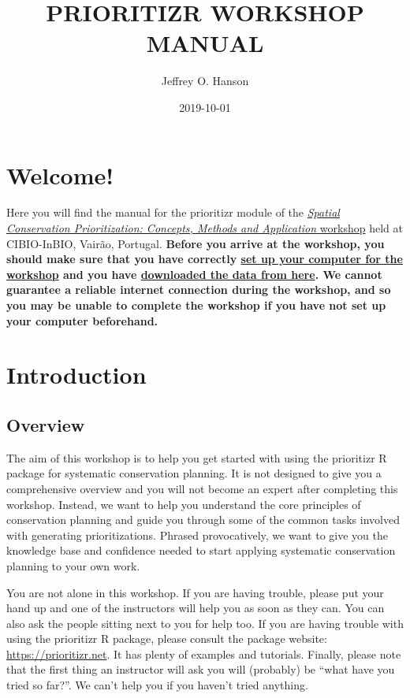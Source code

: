 \documentclass[12pt,]{book}
\title{PRIORITIZR WORKSHOP MANUAL}
\author{Jeffrey O. Hanson}
\date{2019-10-01}
\begin{document}
\maketitle

{
\hypersetup{linkcolor=black}
\setcounter{tocdepth}{0}
\tableofcontents
}
\chapter{Welcome!}\label{welcome}

Here you will find the manual for the prioritizr module of the
\href{https://cibio.up.pt/workshops--courses/details/advanced-course-spatial-conservation-prioritization-}{\emph{Spatial
Conservation Prioritization: Concepts, Methods and Application}
workshop} held at CIBIO-InBIO, Vairão, Portugal. \textbf{Before you
arrive at the workshop, you should make sure that you have correctly
\protect\hyperlink{setup}{set up your computer for the workshop} and you
have
\href{https://github.com/prioritizr/cibio-workshop/raw/master/data.zip}{downloaded
the data from here}. We cannot guarantee a reliable internet connection
during the workshop, and so you may be unable to complete the workshop
if you have not set up your computer beforehand.}

\chapter{Introduction}\label{introduction}

\section{Overview}\label{overview}

The aim of this workshop is to help you get started with using the
prioritizr R package for systematic conservation planning. It is not
designed to give you a comprehensive overview and you will not become an
expert after completing this workshop. Instead, we want to help you
understand the core principles of conservation planning and guide you
through some of the common tasks involved with generating
prioritizations. Phrased provocatively, we want to give you the
knowledge base and confidence needed to start applying systematic
conservation planning to your own work.

You are not alone in this workshop. If you are having trouble, please
put your hand up and one of the instructors will help you as soon as
they can. You can also ask the people sitting next to you for help too.
If you are having trouble with using the prioritizr R package, please
consult the package website: \url{https://prioritizr.net}. It has plenty
of examples and tutorials. Finally, please note that the first thing an
instructor will ask you will (probably) be ``what have you tried so
far?''. We can't help you if you haven't tried anything.
\end{document}
